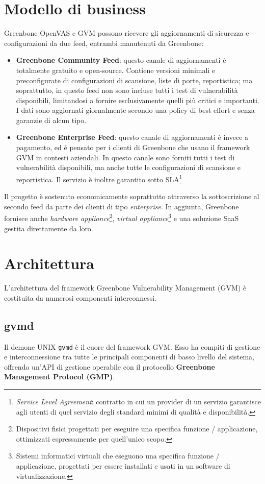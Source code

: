 \section{Modello di business}
Greenbone OpenVAS e GVM possono ricevere gli aggiornamenti di sicurezza e configurazioni da due feed, entrambi manutenuti da Greenbone:
\begin{itemize}
    \item \textbf{Greenbone Community Feed}: questo canale di aggiornamenti è totalmente gratuito e open-source. Contiene versioni minimali e preconfigurate di configurazioni di scansione, liste di porte, reportistica; ma soprattutto, in questo feed non sono incluse tutti i test di vulnerabilità disponibili, limitandosi a fornire esclusivamente quelli più critici e importanti. I dati sono aggiornati giornalmente secondo una policy di best effort e senza garanzie di alcun tipo.
    \item \textbf{Greenbone Enterprise Feed}: questo canale di aggiornamenti è invece a pagamento, ed è pensato per i clienti di Greenbone che usano il framework GVM in contesti aziendali. In questo canale sono forniti tutti i test di vulnerabilità disponibili, ma anche tutte le configurazioni di scansione e reportistica. Il servizio è inoltre garantito sotto SLA\footnote{\emph{Service Level Agreement}: contratto in cui un provider di un servizio garantisce agli utenti di quel servizio degli standard minimi di qualità e disponibilità.}
\end{itemize}
Il progetto è sostenuto economicamente soprattutto attraverso la sottoscrizione al secondo feed da parte dei clienti di tipo \emph{enterprise}. In aggiunta, Greenbone fornisce anche \emph{hardware appliance}\footnote{Dispositivi fisici progettati per eseguire una specifica funzione / applicazione, ottimizzati espressamente per quell'unico scopo.}, \emph{virtual appliance}\footnote{Sistemi informatici virtuali che eseguono una specifica funzione / applicazione, progettati per essere installati e usati in un software di virtualizzazione.} e una soluzione SaaS gestita direttamente da loro.

\section{Architettura}
L'architettura del framework Greenbone Vulnerability Management (GVM) è costituita da numerosi componenti interconnessi.

\subsection{gvmd}
Il demone UNIX \texttt{gvmd} è il cuore del framework GVM. Esso ha compiti di gestione e interconnessione tra tutte le principali componenti di basso livello del sistema, offrendo un'API di gestione operabile con il protocollo \textbf{Greenbone Management Protocol (GMP)}.

